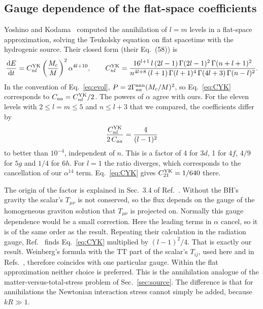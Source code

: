 \documentclass[11pt]{article}
\newcommand{\dd}{\mathrm{d}}
\begin{document}
\subsection{Gauge dependence of the flat-space coefficients}
\label{sec:gauge}

Yoshino and Kodama~\cite{YK14} computed the annihilation of $l=m$ levels in a flat-space approximation, solving the Teukolsky equation on flat spacetime with the hydrogenic source. Their closed form (their Eq.~(58)) is
\begin{equation}
\frac{\dd E}{\dd t}=C^{\rm YK}_{nl}\left(\frac{M_c}{M}\right)^2\alpha^{4l+10},\qquad
C^{\rm YK}_{nl}=\frac{16^{l+1}\,l\,(2l-1)\,\Gamma(2l-1)^2\,\Gamma(n+l+1)^2}{n^{4l+8}\,(l+1)\,\Gamma(l+1)^4\,\Gamma(4l+3)\,\Gamma(n-l)^2}.
\label{eq:CYK}
\end{equation}
In the convention of Eq.~\eqref{eq:evol}, $P=2\Gamma^{\rm ann}_{aa}(M_c/M)^2$, so Eq.~\eqref{eq:CYK} corresponds to $C_{aa}=C^{\rm YK}_{nl}/2$. The powers of $\alpha$ agree with ours. For the eleven levels with $2\le l=m\le5$ and $n\le l+3$ that we compared, the coefficients differ by
\begin{equation}
\frac{C^{\rm YK}_{nl}}{2\,C_{aa}}=\frac{4}{(l-1)^2}
\end{equation}
to better than $10^{-4}$, independent of $n$. This is a factor of 4 for $3d$, 1 for $4f$, $4/9$ for $5g$ and $1/4$ for $6h$. For $l=1$ the ratio diverges, which corresponds to the cancellation of our $\alpha^{14}$ term. Eq.~\eqref{eq:CYK} gives $C^{\rm YK}_{21}=1/640$ there.

The origin of the factor is explained in Sec.~3.4 of Ref.~\cite{YK14}. Without the BH's gravity the scalar's $T_{\mu\nu}$ is not conserved, so the flux depends on the gauge of the homogeneous graviton solution that $T_{\mu\nu}$ is projected on. Normally this gauge dependence would be a small correction. Here the leading terms in $\alpha$ cancel, so it is of the same order as the result. Repeating their calculation in the radiation gauge, Ref.~\cite{YK14} finds Eq.~\eqref{eq:CYK} multiplied by $(l-1)^2/4$. That is exactly our result. Weinberg's formula with the TT part of the scalar's $T_{ij}$, used here and in Refs.~\cite{AD11,ABH15,BGLS21}, therefore coincides with one particular gauge. Within the flat approximation neither choice is preferred. This is the annihilation analogue of the matter-versus-total-stress problem of Sec.~\ref{sec:source}. The difference is that for annihilations the Newtonian interaction stress cannot simply be added, because $kR\gg1$.
\end{document}
